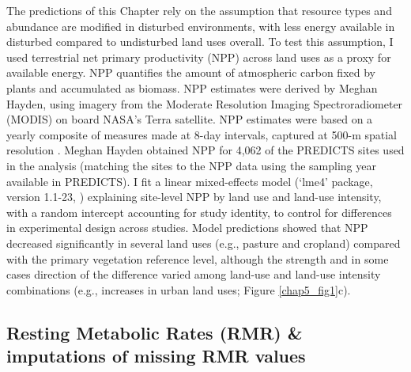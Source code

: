 The predictions of this Chapter rely on the assumption that resource types and abundance are modified in disturbed environments, with less energy available in disturbed compared to undisturbed land uses overall. To test this assumption, I used terrestrial net primary productivity (NPP) across land uses as a proxy for available energy. NPP quantifies the amount of atmospheric carbon fixed by plants and accumulated as biomass. NPP estimates were derived by Meghan Hayden, using imagery from the Moderate Resolution Imaging Spectroradiometer (MODIS) on board NASA’s Terra satellite. NPP estimates were based on a yearly composite of measures made at 8-day intervals, captured at 500-m spatial resolution \citep{Running2015}. Meghan Hayden obtained NPP for 4,062 of the PREDICTS sites used in the analysis (matching the sites to the NPP data using the sampling year available in PREDICTS). I fit a linear mixed-effects model (`lme4' package, version 1.1-23, \citet{Bates2015}) explaining site-level NPP by land use and land-use intensity, with a random intercept accounting for study identity, to control for differences in experimental design across studies. Model predictions showed that NPP decreased significantly in several land uses (e.g., pasture and cropland) compared with the primary vegetation reference level, although the strength and in some cases direction of the difference varied among land-use and land-use intensity combinations (e.g., increases in urban land uses; Figure \ref{chap5_fig1}c).

\subsection{Resting Metabolic Rates (RMR) \& imputations of missing RMR values}

